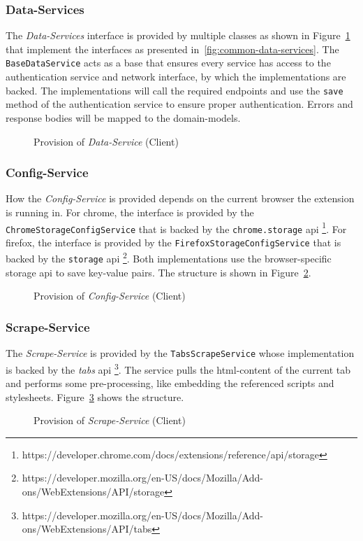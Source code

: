 \subsubsection{Data-Services}
The \textit{Data-Services} interface is provided by multiple classes as shown in Figure~\ref{fig:common-data-services-p} that implement the interfaces as presented in~\ref{fig:common-data-services}. \newline
The \texttt{BaseDataService} acts as a base that ensures every service has access to the authentication service and network interface, by which the implementations are backed.
The implementations will call the required endpoints and use the \texttt{save} method of the authentication service to ensure proper authentication.
Errors and response bodies will be mapped to the domain-models.

\begin{figure}
    \centering
    \caption{Provision of \textit{Data-Service} (Client)}
    \label{fig:common-data-services-p}
\end{figure}

\subsubsection{Config-Service}
How the \textit{Config-Service} is provided depends on the current browser the extension is running in.
For chrome, the interface is provided by the \texttt{ChromeStorageConfigService} that is backed by the \texttt{chrome.storage} api \footnote{https://developer.chrome.com/docs/extensions/reference/api/storage}.
For firefox, the interface is provided by the \texttt{FirefoxStorageConfigService} that is backed by the \texttt{storage} api \footnote{https://developer.mozilla.org/en-US/docs/Mozilla/Add-ons/WebExtensions/API/storage}. \newline
Both implementations use the browser-specific storage api to save key-value pairs.
The structure is shown in Figure~\ref{fig:active-config-service-p}.

\begin{figure}
    \centering
    \caption{Provision of \textit{Config-Service} (Client)}
    \label{fig:active-config-service-p}
\end{figure}

\subsubsection{Scrape-Service}
The \textit{Scrape-Service} is provided by the \texttt{TabsScrapeService} whose implementation is backed by the \textit{tabs} api \footnote{https://developer.mozilla.org/en-US/docs/Mozilla/Add-ons/WebExtensions/API/tabs}.
The service pulls the html-content of the current tab and performs some pre-processing, like embedding the referenced scripts and stylesheets.
Figure~\ref{fig:active-scrape-service-p} shows the structure.

\begin{figure}
    \centering
    \caption{Provision of \textit{Scrape-Service} (Client)}
    \label{fig:active-scrape-service-p}
\end{figure}
